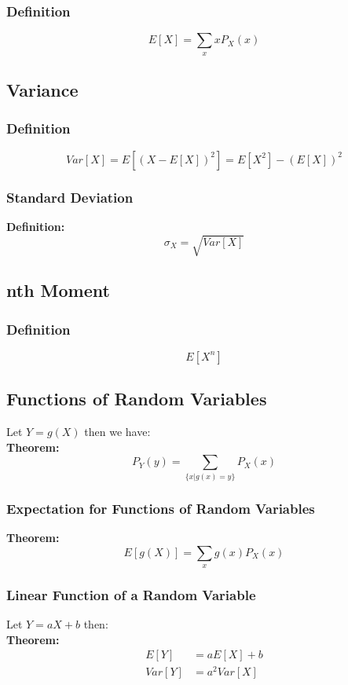 \documentclass[11pt]{article}
\begin{document}
\subsubsection{Definition}
$$E[X] = \sum_{x} xP_X(x)$$

\subsection{Variance}
\subsubsection{Definition}
$$Var[X] = E[(X-E[X])^2] = E[X^2] - (E[X])^2$$

\subsubsection{Standard Deviation}
\indent \indent \indent \textbf{Definition:}\\
$$\sigma_X = \sqrt{Var[X]}$$

\subsection{nth Moment}
\subsubsection{Definition}
$$E[X^n]$$

\subsection{Functions of Random Variables}
\indent Let $Y = g(X)$ then we have:\\
\noindent \textbf{Theorem:}\\
$$P_Y(y) = \sum_{\{x|g(x) = y\}} P_X(x)$$

\subsubsection{Expectation for Functions of Random Variables}
\noindent \textbf{Theorem:}\\
$$E[g(X)] = \sum_{x} g(x)P_X(x)$$

\subsubsection{Linear Function of a Random Variable}
\indent Let $Y = aX + b$ then:\\
\noindent \textbf{Theorem:}\\
\begin{equation*}
    \begin{split}
        E[Y] & = aE[X] + b\\
        Var[Y] & = a^2Var[X]
    \end{split}
\end{equation*}
\end{document}

